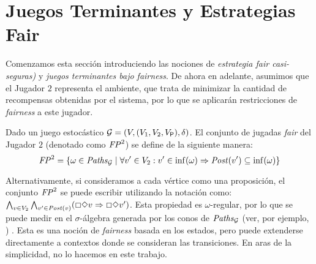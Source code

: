 \section{Juegos Terminantes y Estrategias Fair}\label{sec:stopping_fair}

Comenzamos esta sección introduciendo las nociones de \emph{estrategia fair casi-seguras)} y \emph{juegos terminantes bajo fairness}. 
De ahora en adelante, asumimos que el Jugador $2$ representa el ambiente, que trata de minimizar la cantidad de recompensas obtenidas por el sistema, por lo que se aplicarán restricciones de \textit{fairness} a este jugador.

\begin{definition}
Dado un juego estocástico $\mathcal{G} = (V, (V_1, V_2, V_{\mathsf{P}}), \delta)$.
El conjunto de jugadas \textit{fair} del Jugador $2$ (denotado como $\mathit{FP}^2$) se define de la siguiente manera:
\[
	\mathit{FP}^2 = \{ \omega \in \mathit{Paths}_{\mathcal{G}} \mid \forall v' \in V_2: v' \in \inf(\omega)  \Rightarrow \mathit{Post}(v') \subseteq \inf(\omega) \}
\]
\end{definition}
Alternativamente, si consideramos a cada vértice como una proposición, el conjunto $\mathit{FP}^2$ se puede escribir utilizando la notación {\LTL} como:
$\bigwedge_{v \in V_2} \bigwedge_{v' \in \mathit{Post}(v)}(\Box \Diamond v \Rightarrow \Box \Diamond v')$. Esta propiedad es $\omega$-regular, por lo que se puede medir en el $\sigma$-álgebra generada por los conos de $\mathit{Paths}_{\mathcal{G}}$ (ver, por ejemplo, \cite[p.804]{BaierK08}) . Esta es una noción de \textit{fairness} basada en los estados, pero puede extenderse directamente a contextos donde se consideran las transiciones. En aras de la simplicidad, no lo hacemos en este trabajo.
	
